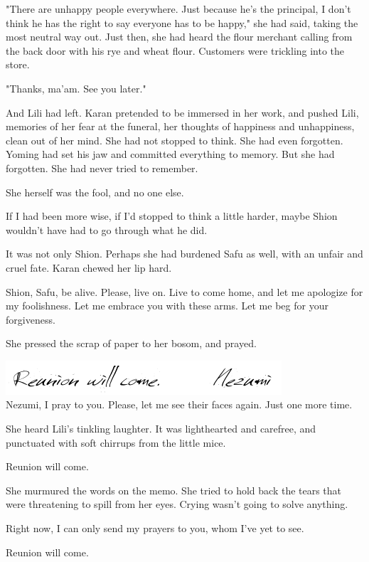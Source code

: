 "There are unhappy people everywhere. Just because he's the principal, I
don't think he has the right to say everyone has to be happy," she had
said, taking the most neutral way out. Just then, she had heard the
flour merchant calling from the back door with his rye and wheat flour.
Customers were trickling into the store.

"Thanks, ma'am. See you later."

And Lili had left. Karan pretended to be immersed in her work, and
pushed Lili, memories of her fear at the funeral, her thoughts of
happiness and unhappiness, clean out of her mind. She had not stopped to
think. She had even forgotten. Yoming had set his jaw and committed
everything to memory. But she had forgotten. She had never tried to
remember.

She herself was the fool, and no one else.

If I had been more wise, if I'd stopped to think a little harder, maybe
Shion wouldn't have had to go through what he did.

It was not only Shion. Perhaps she had burdened Safu as well, with an
unfair and cruel fate. Karan chewed her lip hard.

Shion, Safu, be alive. Please, live on. Live to come home, and let me
apologize for my foolishness. Let me embrace you with these arms. Let me
beg for your forgiveness.

She pressed the scrap of paper to her bosom, and prayed.

\includegraphics{Images/memo7.png}\\

Nezumi, I pray to you. Please, let me see their faces again. Just one
more time.

She heard Lili's tinkling laughter. It was lighthearted and carefree,
and punctuated with soft chirrups from the little mice.

Reunion will come.

She murmured the words on the memo. She tried to hold back the tears
that were threatening to spill from her eyes. Crying wasn't going to
solve anything.

Right now, I can only send my prayers to you, whom I've yet to see.

Reunion will come.

\hypertarget{index_split_001_split_002.htmlux5cux23calibre_pb_29}{}

